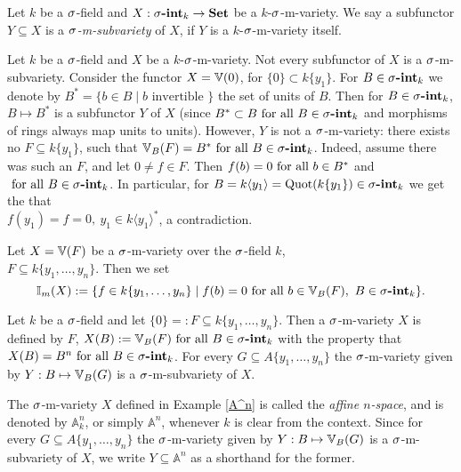 \begin{defn}
Let $k$ be a $\sigma$-field and $X: \sigma\text{{\normalfont\textbf{-int}}}_k \rightarrow {\normalfont\textbf{Set}}$ be a $k$-$\sigma$-m-variety. We say a subfunctor $Y \subseteq X$ is a \emph{$\sigma$-m-subvariety} of $X$, if $Y$ is a $k$-$\sigma$-m-variety itself. 
\end{defn}

 \begin{rem}
Let $k$ be a $\sigma$-field and $X$ be a $k$-$\sigma$-m-variety. Not every subfunctor of $X$ is a $\sigma$-m-subvariety. Consider the functor $X = \mathbb{V}(0)$, for $\{0\} \subset k\{y_1\}$.
For $B \in \sigma\text{{\normalfont\textbf{-int}}}_k$ we denote by $B^* = \{ b \in B \mid b \text{ invertible } \}$ the set of units of $B$. Then for $B \in \sigma\text{{\normalfont\textbf{-int}}}_k$, $B \mapsto B^*$ is a subfunctor $Y$ of $X$ (since $B^* \subset B \text{ for all } B \in \sigma\text{{\normalfont\textbf{-int}}}_k$ and morphisms of rings always map units to units). However, $Y$ is not a $\sigma$-m-variety:
there exists no $F \subseteq k\{y_1\}$, such that $\mathbb{V}_B(F) = B^* \text{ for all } B \in \sigma\text{{\normalfont\textbf{-int}}}_k$.  Indeed, assume there was such an $F$, and let $0 \neq f \in F$. Then $f(b) = 0 \text{ for all } b \in B^*$ and $\text{ for all } B \in \sigma\text{{\normalfont\textbf{-int}}}_k$. In particular,
for $B = k\langle y_1 \rangle = \operatorname{Quot}(k\{y_1\}) \in \sigma\text{{\normalfont\textbf{-int}}}_k$ we get the that \\$f(y_1) = f = 0, ~ y_1 \in k \langle y_1 \rangle^*$, a contradiction.  
\end{rem}

\begin{defn}\label{defnI}
Let $X = \mathbb{V}(F)$ be a $\sigma$-m-variety over the $\sigma$-field $k$, \\$F \subseteq k\{y_1,\ldots,y_n\}$. Then we set $$\mathbb{I}_m(X):= \{ f \in k\{y_1,\ldots,y_n\} \mid f(b) = 0 \text{ for all } b \in \mathbb{V}_B(F), ~ B \in \sigma\text{{\normalfont\textbf{-int}}}_k \}.$$ 
\end{defn}

\begin{ex}\label{A^n}
Let $k$ be a $\sigma$-field and let $\{ 0 \} =: F \subseteq k\{y_1,\ldots,y_n\}$. Then a $\sigma$-m-variety $X$ is defined by $F$, $X(B) := \mathbb{V}_B(F) \text{ for all } B \in \sigma\text{{\normalfont\textbf{-int}}}_k$ with the property that $X(B) = B^n \text{ for all } B \in \sigma\text{{\normalfont\textbf{-int}}}_k$.
For every $G \subseteq A\{y_1,\ldots,y_n\}$ the $\sigma$-m-variety given by $Y: B \mapsto \mathbb{V}_B(G)$ is a $\sigma$-m-subvariety of $X$. 
\end{ex}

\begin{defn}\label{defA^n}
The $\sigma$-m-variety $X$ defined in Example \ref{A^n} is called the \emph{affine $n$-space}, and is denoted by $\mathbb{A}^n_k$, 
or simply $\mathbb{A}^n$, whenever $k$ is clear from the context.   
Since for every $G \subseteq A\{y_1,\ldots,y_n\}$ the $\sigma$-m-variety given by $Y: B \mapsto \mathbb{V}_B(G)$ is a $\sigma$-m-subvariety of $X$, 
we write $Y \subseteq \mathbb{A}^n$ as a shorthand for the former.
\end{defn}

